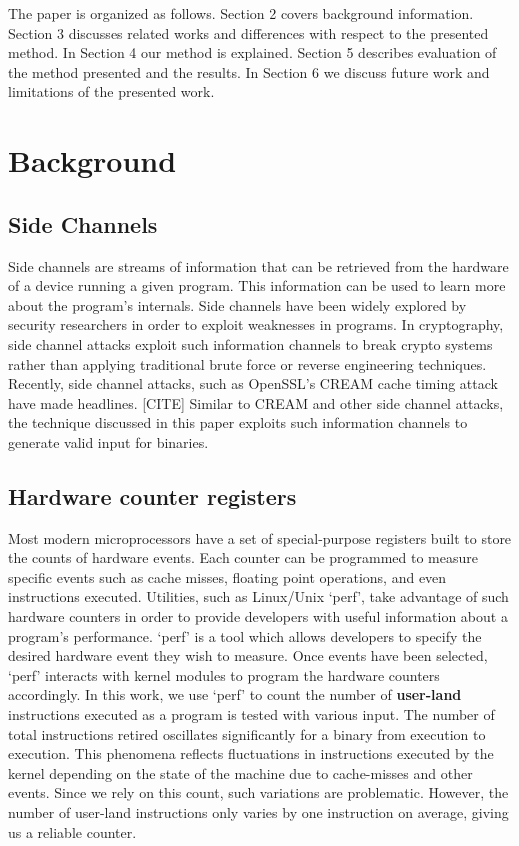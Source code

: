 \documentclass[10pt,twocolumn]{article}
\begin{document}
The paper is organized as follows.
Section 2 covers background information.
Section 3 discusses related works and differences with respect to the presented method.
In Section 4 our method is explained.
Section 5 describes evaluation of the method presented and the results.
In Section 6 we discuss future work and limitations of the presented work.

\section{Background}
 
\subsection{Side Channels}

Side channels are streams of information that can be retrieved from the hardware of a device running a given program.
This information can be used to learn more about the program's internals.
Side channels have been widely explored by security researchers in order to exploit weaknesses in programs.
In cryptography, side channel attacks exploit such information channels to break crypto systems rather than applying traditional brute force or reverse engineering techniques.
Recently, side channel attacks, such as OpenSSL's CREAM cache timing attack have made headlines. [CITE]
Similar to CREAM and other side channel attacks, the technique discussed in this paper exploits such information channels to generate valid input for binaries.

\subsection{Hardware counter registers}

Most modern microprocessors have a set of special-purpose registers built to store the counts of hardware events.
Each counter can be programmed to measure specific events such as cache misses, floating point operations, and even instructions executed.
Utilities, such as Linux/Unix `perf', take advantage of such hardware counters in order to provide developers with useful information about a program's performance.
`perf' is a tool which allows developers to specify the desired hardware event they wish to measure.
Once events have been selected, `perf' interacts with kernel modules to program the hardware counters accordingly.
In this work, we use `perf' to count the number of \textbf{user-land} instructions executed as a program is tested with various input.
The number of total instructions retired oscillates significantly for a binary from execution to execution.
This phenomena reflects fluctuations in instructions executed by the kernel depending on the state of the machine due to cache-misses and other events.
Since we rely on this count, such variations are problematic.
However, the number of user-land instructions only varies by one instruction on average, giving us a reliable counter.
\end{document}
